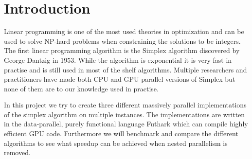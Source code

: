 \section{Introduction}
Linear programming is one of the most used theories in optimization and can be used to solve NP-hard problems when constraining the solutions to be integers. The first linear programming algorithm is the Simplex algorithm discovered by George Dantzig in 1953. While the algorithm is exponential it is very fast in practise and is still used in most of the shelf algorithms. Multiple researchers and practitioners have made both CPU and GPU parallel versions of Simplex but none of them are to our knowledge  used in practise.

In this project we try to create three different massively parallel implementations of the simplex algorithm on multiple instances. The implementations are written in the data-parallel, purely functional language Futhark which can compile highly efficient GPU code. Furthermore we will benchmark and compare the different algorithms to see what speedup can be achieved when nested parallelism is removed.
